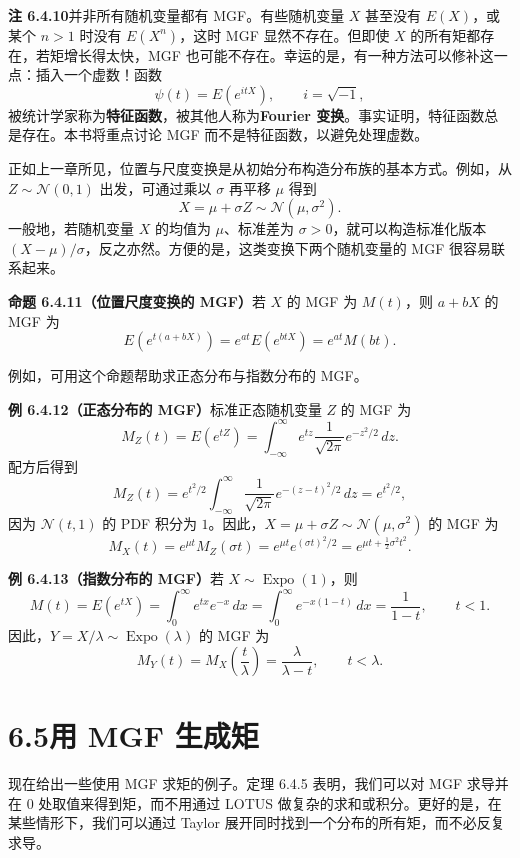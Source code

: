 \documentclass[UTF8, 12pt, fontset=fandol, oneside]{ctexart}
\begin{document}
\noindent\textbf{注 6.4.10}\quad 并非所有随机变量都有 MGF。有些随机变量 $X$ 甚至没有 $E(X)$，或某个 $n>1$ 时没有 $E(X^n)$，这时 MGF 显然不存在。但即使 $X$ 的所有矩都存在，若矩增长得太快，MGF 也可能不存在。幸运的是，有一种方法可以修补这一点：插入一个虚数！函数
\[
  \psi(t)=E(e^{itX}),\qquad i=\sqrt{-1},
\]
被统计学家称为\textbf{特征函数}，被其他人称为\textbf{Fourier 变换}。事实证明，特征函数总是存在。本书将重点讨论 MGF 而不是特征函数，以避免处理虚数。

正如上一章所见，位置与尺度变换是从初始分布构造分布族的基本方式。例如，从 $Z\sim\mathcal{N}(0,1)$ 出发，可通过乘以 $\sigma$ 再平移 $\mu$ 得到
\[
  X=\mu+\sigma Z\sim\mathcal{N}(\mu,\sigma^2).
\]
一般地，若随机变量 $X$ 的均值为 $\mu$、标准差为 $\sigma>0$，就可以构造标准化版本 $(X-\mu)/\sigma$，反之亦然。方便的是，这类变换下两个随机变量的 MGF 很容易联系起来。

\noindent\textbf{命题 6.4.11（位置尺度变换的 MGF）}\quad 若 $X$ 的 MGF 为 $M(t)$，则 $a+bX$ 的 MGF 为
\[
  E(e^{t(a+bX)})=e^{at}E(e^{btX})=e^{at}M(bt).
\]

例如，可用这个命题帮助求正态分布与指数分布的 MGF。

\noindent\textbf{例 6.4.12（正态分布的 MGF）}\quad 标准正态随机变量 $Z$ 的 MGF 为
\[
  M_Z(t)=E(e^{tZ})
  =
  \int_{-\infty}^{\infty}
  e^{tz}\frac1{\sqrt{2\pi}}e^{-z^2/2}\,dz.
\]
配方后得到
\[
  M_Z(t)
  =
  e^{t^2/2}
  \int_{-\infty}^{\infty}
  \frac1{\sqrt{2\pi}}e^{-(z-t)^2/2}\,dz
  =
  e^{t^2/2},
\]
因为 $\mathcal{N}(t,1)$ 的 PDF 积分为 $1$。因此，$X=\mu+\sigma Z\sim\mathcal{N}(\mu,\sigma^2)$ 的 MGF 为
\[
  M_X(t)
  =
  e^{\mu t}M_Z(\sigma t)
  =
  e^{\mu t}e^{(\sigma t)^2/2}
  =
  e^{\mu t+\frac12\sigma^2t^2}.
\]

\noindent\textbf{例 6.4.13（指数分布的 MGF）}\quad 若 $X\sim\operatorname{Expo}(1)$，则
\[
  M(t)=E(e^{tX})
  =
  \int_0^{\infty}e^{tx}e^{-x}\,dx
  =
  \int_0^{\infty}e^{-x(1-t)}\,dx
  =
  \frac1{1-t},\qquad t<1.
\]
因此，$Y=X/\lambda\sim\operatorname{Expo}(\lambda)$ 的 MGF 为
\[
  M_Y(t)=M_X\left(\frac{t}{\lambda}\right)
  =
  \frac{\lambda}{\lambda-t},\qquad t<\lambda.
\]

\section*{6.5\quad 用 MGF 生成矩}

现在给出一些使用 MGF 求矩的例子。定理 6.4.5 表明，我们可以对 MGF 求导并在 $0$ 处取值来得到矩，而不用通过 LOTUS 做复杂的求和或积分。更好的是，在某些情形下，我们可以通过 Taylor 展开同时找到一个分布的所有矩，而不必反复求导。
\end{document}
